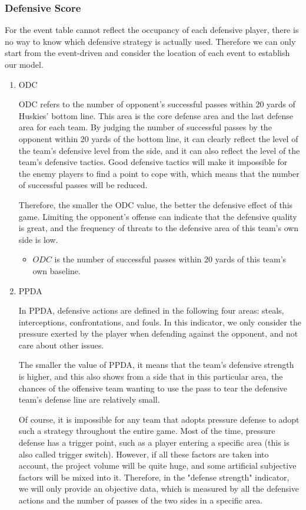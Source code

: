 \documentclass{mcmthesis}
\begin{document}
\subsubsection{Defensive Score}
	\qquad For the event table cannot reflect the occupancy of each defensive player, there is no way to know which defensive strategy is actually used. Therefore we can only start from the event-driven and consider the location of each event to establish our model.
	\begin{enumerate}
	\item ODC
	
	\qquad ODC refers to the number of opponent's successful passes within 20 yards of Huskies' bottom line. This area is the core defense area and the last defense area for each team.  By judging the number of successful passes by the opponent within 20 yards of the bottom line, it can clearly reflect the level of the team's defensive level from the side, and it can also reflect the level of the team's defensive tactics. Good defensive tactics will make it impossible for the enemy players to find a point to cope with, which means that the number of successful passes will be reduced.

	\qquad Therefore, the smaller the ODC value, the better the defensive effect of this game. Limiting the opponent's offense can indicate that the defensive quality is great, and the frequency of threats to the defensive area of ​​this team's own side is low.

	\begin{itemize}
		\item $ODC$ is the number of successful passes within 20 yards of this team's own baseline.
	\end{itemize}

	\item PPDA
	
	\qquad In PPDA, defensive actions are defined in the following four areas: steals, interceptions, confrontations, and fouls.  In this indicator, we only consider the pressure exerted by the player when defending against the opponent, and not care about other issues.

	\qquad The smaller the value of PPDA, it means that the team's defensive strength is higher, and this also shows from a side that in this particular area, the chances of the offensive team wanting to use the pass to tear the defensive team's defense line are relatively small.

	\qquad Of course, it is impossible for any team that adopts pressure defense to adopt such a strategy throughout the entire game. Most of the time, pressure defense has a trigger point, such as a player entering a specific area (this is also called trigger switch).  However, if all these factors are taken into account, the project volume will be quite huge, and some artificial subjective factors will be mixed into it.  Therefore, in the "defense strength" indicator, we will only provide an objective data, which is measured by all the defensive actions and the number of passes of the two sides in a specific area.


\end{enumerate}
\end{document}
